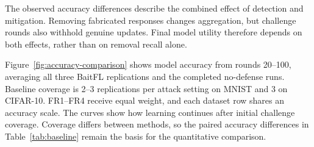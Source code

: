 \documentclass[journal]{IEEEtran}
\begin{document}


The observed accuracy differences describe the combined effect of detection and
mitigation. Removing fabricated responses changes aggregation, but
challenge rounds also withhold genuine updates. Final model utility
therefore depends on both effects, rather than on removal recall alone.

Figure~\ref{fig:accuracy-comparison} shows model accuracy from rounds
20--100, averaging all three BaitFL replications and the completed
no-defense runs. Baseline coverage is 2--3
replications per attack setting on MNIST and 3
on CIFAR-10. FR1--FR4 receive equal weight,
and each dataset row shares an accuracy scale. The curves show how
learning continues after initial challenge coverage. Coverage differs
between methods, so the paired accuracy differences in
Table~\ref{tab:baseline} remain the basis for the quantitative comparison.
\end{document}

